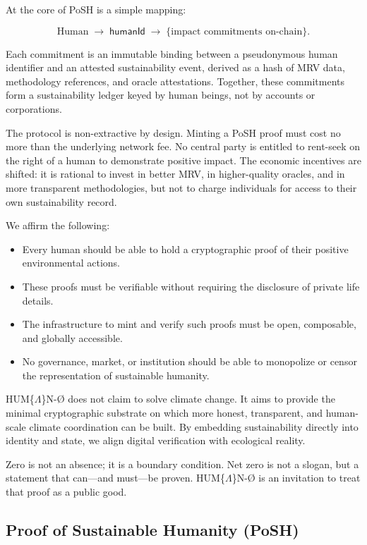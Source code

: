 \documentclass{article}
\begin{document}
At the core of PoSH is a simple mapping:

\begin{equation}
\text{Human} \;\rightarrow\; \mathsf{humanId} \;\rightarrow\;
  \{\text{impact commitments on-chain}\}.
\end{equation}

Each commitment is an immutable binding between a pseudonymous human identifier
and an attested sustainability event, derived as a hash of MRV data, methodology
references, and oracle attestations. Together, these commitments form a
sustainability ledger keyed by human beings, not by accounts or corporations.

The protocol is non-extractive by design. Minting a PoSH proof must cost no more
than the underlying network fee. No central party is entitled to rent-seek on
the right of a human to demonstrate positive impact. The economic incentives are
shifted: it is rational to invest in better MRV, in higher-quality oracles, and
in more transparent methodologies, but not to charge individuals for access to
their own sustainability record.

We affirm the following:

\begin{itemize}
\item Every human should be able to hold a cryptographic proof of their
positive environmental actions.
\item These proofs must be verifiable without requiring the disclosure of
private life details.
\item The infrastructure to mint and verify such proofs must be open,
composable, and globally accessible.
\item No governance, market, or institution should be able to monopolize or
censor the representation of sustainable humanity.
\end{itemize}

HUM\{$\Lambda$\}N-Ø does not claim to solve climate change. It aims to
provide the minimal cryptographic substrate on which more honest, transparent,
and human-scale climate coordination can be built. By embedding sustainability
directly into identity and state, we align digital verification with ecological
reality.

Zero is not an absence; it is a boundary condition. Net zero is not a slogan,
but a statement that can---and must---be proven. HUM\{$\Lambda$\}N-Ø is an
invitation to treat that proof as a public good.

\subsection{Proof of Sustainable Humanity (PoSH)}
\end{document}
